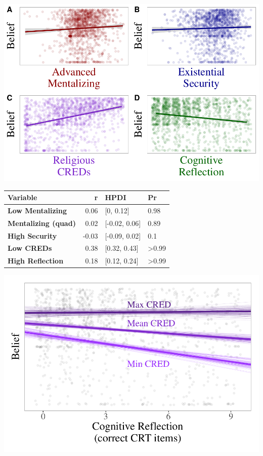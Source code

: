 \documentclass[]{article}
\begin{document}
\includegraphics{disbelief-origins-ms_files/figure-latex/individual scatters-1.pdf}

\begin{table}
\begin{tabular}{>{\bfseries}l|r|l|l}
\hline
Variable & r & HPDI & Pr\\
\hline
Low Mentalizing & 0.06 & [0, 0.12] & 0.98\\
\hline
Mentalizing (quad) & 0.02 & [-0.02, 0.06] & 0.89\\
\hline
High Security & -0.03 & [-0.09, 0.02] & 0.1\\
\hline
Low CREDs & 0.38 & [0.32, 0.43] & >0.99\\
\hline
High Reflection & 0.18 & [0.12, 0.24] & >0.99\\
\hline
\end{tabular}\end{table}

\includegraphics{disbelief-origins-ms_files/figure-latex/interaction plot-1.pdf}
\end{document}
